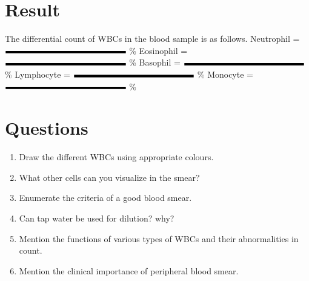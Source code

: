 \documentclass[a4paper,12pt]{book}
\begin{document}
							\section*{Result}
							The differential count of WBCs in the blood sample is as follows.\newline\vspace{.5cm}
							Neutrophil = $\rule{5cm}{0.1cm}$ \%\newline\vspace{.5cm}
							Eosinophil = $\rule{5cm}{0.1cm}$ \%\newline\vspace{.5cm}
							Basophil = $\rule{5cm}{0.1cm}$ \%\newline\vspace{.5cm}
							Lymphocyte = $\rule{5cm}{0.1cm}$ \%\newline\vspace{.5cm}
							Monocyte =$\rule{5cm}{0.1cm}$ \%

							\section*{Questions}
							\begin{enumerate}
								\item{Draw the different WBCs using appropriate colours.}
								\item{What other cells can you visualize in the smear?}
								\item{Enumerate the criteria of a good blood smear.}
								\item{Can tap water be used for dilution? why?}
								\item{Mention the functions of various types of WBCs and their abnormalities in count.}
								\item{Mention the clinical importance of peripheral blood smear.}
							\end{enumerate}

							\newpage
\end{document}
